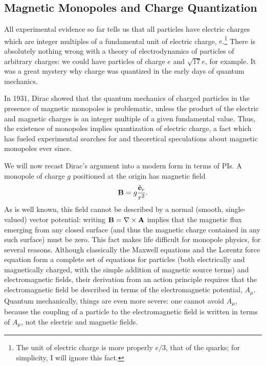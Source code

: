 \documentclass[12pt]{article}
\begin{document}
\subsection{Magnetic Monopoles and Charge Quantization}

All experimental evidence so far tells us
that all particles have electric charges which
are integer multiples of a fundamental unit of electric charge,
$e$.\footnote{The unit of electric charge is more properly $e/3$,
that of the quarks; for simplicity, I will ignore this fact.}
There is absolutely nothing wrong with a theory of electrodynamics of
particles of arbitrary charges: we could have particles of charge $e$
and $\sqrt{17}e$, for example. It was a great mystery why charge was
quantized in the early days of quantum mechanics.

In 1931, Dirac showed that the quantum mechanics of charged particles
in the presence of magnetic monopoles is problematic, unless the
product of the electric and magnetic charges is an integer multiple of
a given fundamental value. Thus, the existence of monopoles implies
quantization of electric charge, a fact which has fueled experimental
searches for and theoretical speculations about magnetic monopoles
ever since.

We will now recast Dirac's argument into a modern form in terms of PIs.
A monopole of charge $g$ positioned at the origin has magnetic field
\[  {\mathbf B}=g{{\hat{{\mathbf e}}}_r\over r^2}.
\]
As is well known,
this field cannot be described by a normal (smooth, single-valued)
vector potential: writing ${\mathbf B}=\nabla\times{\mathbf A}$ implies that the
magnetic flux emerging from any closed surface (and thus the
magnetic charge contained in any such surface) must be zero. This fact
makes life difficult for monopole physics, for several
reasons. Although classically the Maxwell equations and the Lorentz
force equation form a complete set of equations for particles (both
electrically and magnetically charged, with the simple addition of
magnetic source terms) and
electromagnetic fields, their derivation from an action principle
requires that the electromagnetic field be described in terms of the
electromagnetic potential, $A_\mu$. Quantum mechanically, things are
even more severe: one cannot avoid $A_\mu$,
because the coupling of a particle to the electromagnetic
field is written in terms of $A_\mu$, not the electric and magnetic
fields.
\end{document}
